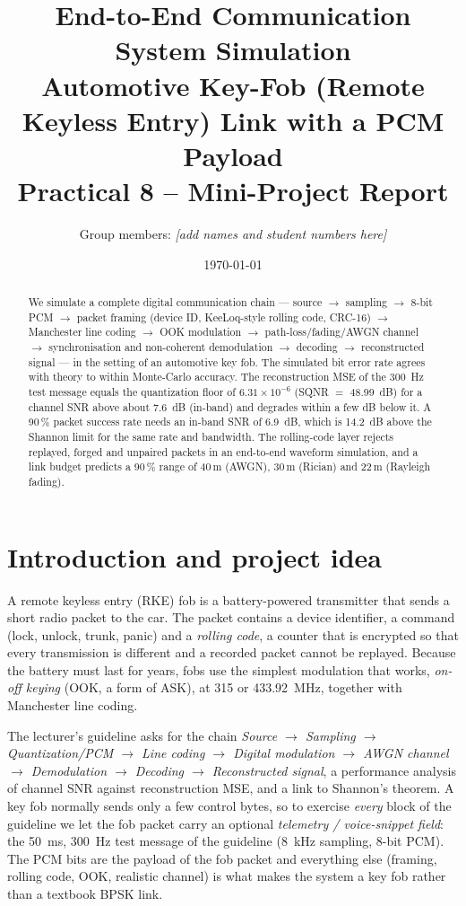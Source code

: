 \documentclass[11pt,a4paper]{article}
\title{\textbf{End-to-End Communication System Simulation}\\[2pt]
\large Automotive Key-Fob (Remote Keyless Entry) Link with a PCM Payload\\[2pt]
\normalsize Practical 8 -- Mini-Project Report}
\author{Group members: \textit{[add names and student numbers here]}}
\date{\today}
\begin{document}
\maketitle
\begin{abstract}
We simulate a complete digital communication chain --- source $\to$ sampling $\to$ 8-bit PCM $\to$ packet framing
(device ID, KeeLoq-style rolling code, CRC-16) $\to$ Manchester line coding $\to$ OOK modulation $\to$ path-loss/fading/AWGN channel
$\to$ synchronisation and non-coherent demodulation $\to$ decoding $\to$ reconstructed signal --- in the setting of an automotive key fob.
The simulated bit error rate agrees with theory to within Monte-Carlo accuracy. The reconstruction MSE of the 300~Hz test message equals the quantization floor
of $6.31\times10^{-6}$ (SQNR $=$ 48.99~dB) for a channel SNR above about 7.6~dB (in-band) and degrades within a few dB below it.
A 90\,\% packet success rate needs an in-band SNR of 6.9~dB, which is 14.2~dB above the Shannon limit for the same rate and bandwidth.
The rolling-code layer rejects replayed, forged and unpaired packets in an end-to-end waveform simulation, and a link budget predicts a 90\,\% range of
40\,m (AWGN), 30\,m (Rician) and 22\,m (Rayleigh fading).
\end{abstract}

\tableofcontents
\newpage

\section{Introduction and project idea}
A remote keyless entry (RKE) fob is a battery-powered transmitter that sends a short radio packet to the car. The packet contains a device
identifier, a command (lock, unlock, trunk, panic) and a \emph{rolling code}, a counter that is encrypted so that every transmission is different and a
recorded packet cannot be replayed. Because the battery must last for years, fobs use the simplest modulation that works, \emph{on-off keying} (OOK, a form of ASK),
at 315 or 433.92~MHz, together with Manchester line coding.

The lecturer's guideline asks for the chain \emph{Source $\to$ Sampling $\to$ Quantization/PCM $\to$ Line coding $\to$ Digital modulation $\to$ AWGN channel
$\to$ Demodulation $\to$ Decoding $\to$ Reconstructed signal}, a performance analysis of channel SNR against reconstruction MSE, and a link to Shannon's theorem.
A key fob normally sends only a few control bytes, so to exercise \emph{every} block of the guideline we let the fob packet carry an optional
\emph{telemetry / voice-snippet field}: the 50~ms, 300~Hz test message of the guideline (8~kHz sampling, 8-bit PCM). The PCM bits are the payload of the fob packet and
everything else (framing, rolling code, OOK, realistic channel) is what makes the system a key fob rather than a textbook BPSK link.
\end{document}
